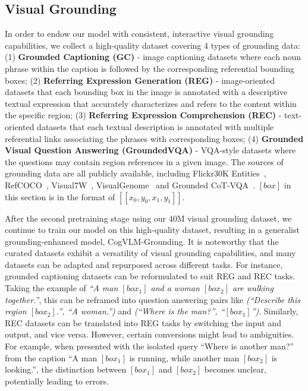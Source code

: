 \subsection{Visual Grounding}








In order to endow our model with consistent, interactive visual grounding capabilities, we collect a high-quality dataset covering 4 types of grounding data: (1) \textbf{Grounded Captioning (GC)} - image captioning datasets where each noun phrase within the caption is followed by the corresponding referential bounding boxes; (2) \textbf{Referring Expression Generation (REG)} - image-oriented datasets that each bounding box in the image is annotated with a descriptive textual expression that accurately characterizes and refers to the content within the specific region; (3) \textbf{Referring Expression Comprehension (REC)} - text-oriented datasets that each textual description is annotated with multiple referential links associating the phrases with corresponding boxes; (4) \textbf{Grounded Visual Question Answering (GroundedVQA)} - VQA-style datasets where the questions may contain region references in a given image.
The sources of grounding data are all publicly available, including Flickr30K Entities~\citep{plummer2015flickr30k}, RefCOCO~\citep{kazemzadeh2014referitgame,mao2016generation,yu2016modeling}, Visual7W~\citep{zhu2016visual7w}, VisualGenome~\citep{krishna2017visual} and Grounded CoT-VQA~\citep{chen2023shikra}.
$[box]$ in this section is in the format of $[[x_0, y_0, x_1, y_1]]$. 



After the second pretraining stage using our 40M visual grounding dataset, we continue to train our model on this high-quality dataset, resulting in a generalist grounding-enhanced model, CogVLM-Grounding.
It is noteworthy that the curated datasets exhibit a versatility of visual grounding capabilities, and many datasets can be adapted and repurposed across different tasks.
For instance, grounded captioning datasets can be reformulated to suit REG and REC tasks. Taking the example of \textit{``A man $[box_1]$ and a woman $[box_2]$ are walking together.''}, this can be reframed into question answering pairs like \textit{(``Describe this region $[box_2]$.'', ``A woman.'')} and \textit{(``Where is the man?'', ``$[box_1]$'')}. Similarly, REC datasets can be translated into REG tasks by switching the input and output, and vice versa. However, certain conversions might lead to ambiguities. For example, when presented with the isolated query ``Where is another man?'' from the caption ``A man $[box_1]$ is running, while another man $[box_2]$ is looking.'', the distinction between $[box_1]$ and $[box_2]$ becomes unclear, potentially leading to errors.

